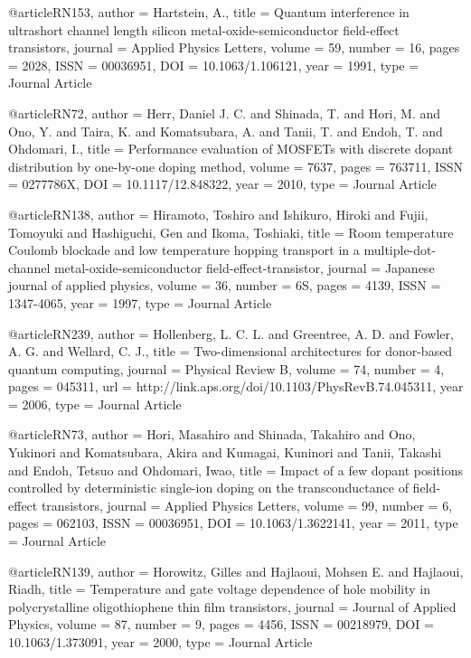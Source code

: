 @article{RN153,
   author = {Hartstein, A.},
   title = {Quantum interference in ultrashort channel length silicon metal-oxide-semiconductor field-effect transistors},
   journal = {Applied Physics Letters},
   volume = {59},
   number = {16},
   pages = {2028},
   ISSN = {00036951},
   DOI = {10.1063/1.106121},
   year = {1991},
   type = {Journal Article}
}

@article{RN72,
   author = {Herr, Daniel J. C. and Shinada, T. and Hori, M. and Ono, Y. and Taira, K. and Komatsubara, A. and Tanii, T. and Endoh, T. and Ohdomari, I.},
   title = {Performance evaluation of MOSFETs with discrete dopant distribution by one-by-one doping method},
   volume = {7637},
   pages = {763711},
   ISSN = {0277786X},
   DOI = {10.1117/12.848322},
   year = {2010},
   type = {Journal Article}
}

@article{RN138,
   author = {Hiramoto, Toshiro and Ishikuro, Hiroki and Fujii, Tomoyuki and Hashiguchi, Gen and Ikoma, Toshiaki},
   title = {Room temperature Coulomb blockade and low temperature hopping transport in a multiple-dot-channel metal-oxide-semiconductor field-effect-transistor},
   journal = {Japanese journal of applied physics},
   volume = {36},
   number = {6S},
   pages = {4139},
   ISSN = {1347-4065},
   year = {1997},
   type = {Journal Article}
}

@article{RN239,
   author = {Hollenberg, L. C. L. and Greentree, A. D. and Fowler, A. G. and Wellard, C. J.},
   title = {Two-dimensional architectures for donor-based quantum computing},
   journal = {Physical Review B},
   volume = {74},
   number = {4},
   pages = {045311},
   url = {http://link.aps.org/doi/10.1103/PhysRevB.74.045311},
   year = {2006},
   type = {Journal Article}
}

@article{RN73,
   author = {Hori, Masahiro and Shinada, Takahiro and Ono, Yukinori and Komatsubara, Akira and Kumagai, Kuninori and Tanii, Takashi and Endoh, Tetsuo and Ohdomari, Iwao},
   title = {Impact of a few dopant positions controlled by deterministic single-ion doping on the transconductance of field-effect transistors},
   journal = {Applied Physics Letters},
   volume = {99},
   number = {6},
   pages = {062103},
   ISSN = {00036951},
   DOI = {10.1063/1.3622141},
   year = {2011},
   type = {Journal Article}
}

@article{RN139,
   author = {Horowitz, Gilles and Hajlaoui, Mohsen E. and Hajlaoui, Riadh},
   title = {Temperature and gate voltage dependence of hole mobility in polycrystalline oligothiophene thin film transistors},
   journal = {Journal of Applied Physics},
   volume = {87},
   number = {9},
   pages = {4456},
   ISSN = {00218979},
   DOI = {10.1063/1.373091},
   year = {2000},
   type = {Journal Article}
}

